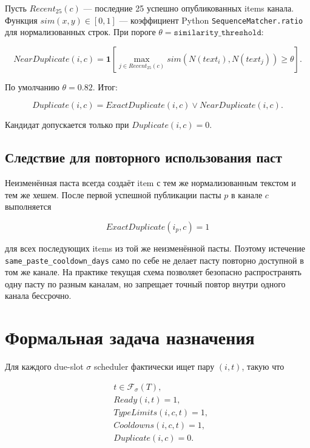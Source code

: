 \documentclass[12pt,a4paper]{article}
\newcommand{\Ind}{\mathbf{1}}
\newcommand{\Field}[1]{\texttt{#1}}
\begin{document}
Пусть $Recent_{25}(c)$ --- последние 25 успешно опубликованных items канала.
Функция $sim(x,y)\in[0,1]$ --- коэффициент Python
\texttt{SequenceMatcher.ratio} для нормализованных строк. При пороге
$\theta=\Field{similarity\_threshold}$:

\begin{equation}
  NearDuplicate(i,c)=
  \Ind\!\left[
    \max_{j\in Recent_{25}(c)}sim(N(text_i),N(text_j))\geq\theta
  \right].
  \label{eq:near-duplicate}
\end{equation}

По умолчанию $\theta=0.82$. Итог:

\begin{equation}
  Duplicate(i,c)=ExactDuplicate(i,c)\lor NearDuplicate(i,c).
  \label{eq:duplicate}
\end{equation}

Кандидат допускается только при $Duplicate(i,c)=0$.

\subsection{Следствие для повторного использования паст}

Неизменённая паста всегда создаёт item с тем же нормализованным текстом и тем же
хешем. После первой успешной публикации пасты $p$ в канале $c$ выполняется

\begin{equation}
  ExactDuplicate(i_p,c)=1
\end{equation}

для всех последующих items из той же неизменённой пасты. Поэтому истечение
\Field{same\_paste\_cooldown\_days} само по себе не делает пасту повторно
доступной в том же канале. На практике текущая схема позволяет безопасно
распространять одну пасту по разным каналам, но запрещает точный повтор внутри
одного канала бессрочно.

\section{Формальная задача назначения}

Для каждого due-slot $\sigma$ scheduler фактически ищет пару $(i,t)$, такую что

\begin{align}
  &t\in\mathcal{F}_\sigma(T),\\
  &Ready(i,t)=1,\\
  &TypeLimits(i,c,t)=1,\\
  &Cooldowns(i,c,t)=1,\\
  &Duplicate(i,c)=0.
\end{align}
\end{document}
